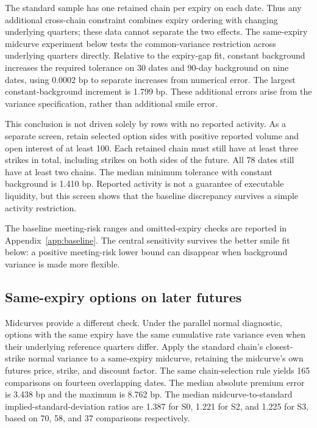 The standard sample has one retained chain per expiry on each date. Thus any additional cross-chain constraint combines expiry ordering with changing underlying quarters; these data cannot separate the two effects. The same-expiry midcurve experiment below tests the common-variance restriction across underlying quarters directly. Relative to the expiry-gap fit, constant background increases the required tolerance on 30 dates and 90-day background on nine dates, using 0.0002 bp to separate increases from numerical error. The largest constant-background increment is 1.799 bp. These additional errors arise from the variance specification, rather than additional smile error.

This conclusion is not driven solely by rows with no reported activity. As a separate screen, retain selected option sides with positive reported volume and open interest of at least 100. Each retained chain must still have at least three strikes in total, including strikes on both sides of the future. All 78 dates still have at least two chains. The median minimum tolerance with constant background is 1.410 bp. Reported activity is not a guarantee of executable liquidity, but this screen shows that the baseline discrepancy survives a simple activity restriction.

The baseline meeting-risk ranges and omitted-expiry checks are reported in Appendix~\ref{app:baseline}. The central sensitivity survives the better smile fit below: a positive meeting-risk lower bound can disappear when background variance is made more flexible.

\subsection{Same-expiry options on later futures}
Midcurves provide a different check. Under the parallel normal diagnostic, options with the same expiry have the same cumulative rate variance even when their underlying reference quarters differ. Apply the standard chain's closest-strike normal variance to a same-expiry midcurve, retaining the midcurve's own futures price, strike, and discount factor. The same chain-selection rule yields 165 comparisons on fourteen overlapping dates. The median absolute premium error is 3.438 bp and the maximum is 8.762 bp. The median midcurve-to-standard implied-standard-deviation ratios are 1.387 for S0, 1.221 for S2, and 1.225 for S3, based on 70, 58, and 37 comparisons respectively.



